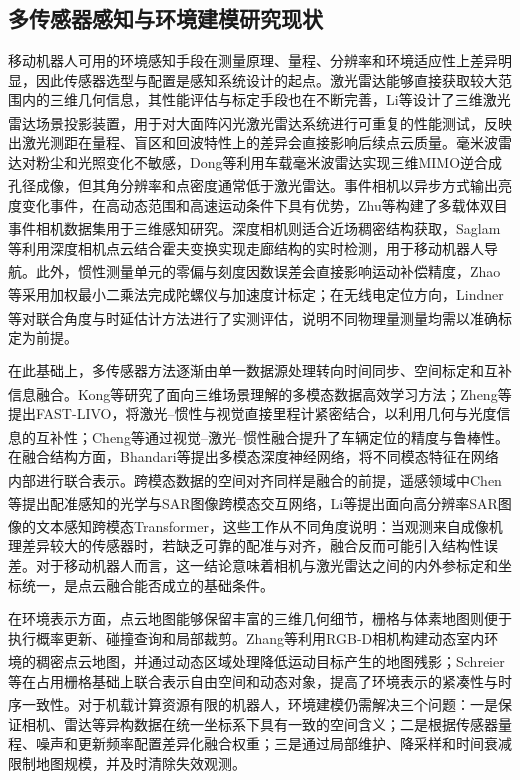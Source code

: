 \subsection{多传感器感知与环境建模研究现状}
移动机器人可用的环境感知手段在测量原理、量程、分辨率和环境适应性上差异明显，因此传感器选型与配置是感知系统设计的起点。激光雷达能够直接获取较大范围内的三维几何信息，其性能评估与标定手段也在不断完善，Li等设计了三维激光雷达场景投影装置，用于对大面阵闪光激光雷达系统进行可重复的性能测试\textsuperscript{\cite{LI2025112972}}，反映出激光测距在量程、盲区和回波特性上的差异会直接影响后续点云质量。毫米波雷达对粉尘和光照变化不敏感，Dong等利用车载毫米波雷达实现三维MIMO逆合成孔径成像\textsuperscript{\cite{10028086}}，但其角分辨率和点密度通常低于激光雷达。事件相机以异步方式输出亮度变化事件，在高动态范围和高速运动条件下具有优势，Zhu等构建了多载体双目事件相机数据集用于三维感知研究\textsuperscript{\cite{8288670}}。深度相机则适合近场稠密结构获取，Saglam等利用深度相机点云结合霍夫变换实现走廊结构的实时检测，用于移动机器人导航\textsuperscript{\cite{9649842}}。此外，惯性测量单元的零偏与刻度因数误差会直接影响运动补偿精度，Zhao等采用加权最小二乘法完成陀螺仪与加速度计标定\textsuperscript{\cite{8996235}}；在无线电定位方向，Lindner等对联合角度与时延估计方法进行了实测评估\textsuperscript{\cite{7346780}}，说明不同物理量测量均需以准确标定为前提。

在此基础上，多传感器方法逐渐由单一数据源处理转向时间同步、空间标定和互补信息融合。Kong等研究了面向三维场景理解的多模态数据高效学习方法\textsuperscript{\cite{10856442}}；Zheng等提出FAST-LIVO，将激光--惯性与视觉直接里程计紧密结合，以利用几何与光度信息的互补性\textsuperscript{\cite{9981107}}；Cheng等通过视觉--激光--惯性融合提升了车辆定位的精度与鲁棒性\textsuperscript{\cite{10475560}}。在融合结构方面，Bhandari等提出多模态深度神经网络，将不同模态特征在网络内部进行联合表示\textsuperscript{\cite{8628711}}。跨模态数据的空间对齐同样是融合的前提，遥感领域中Chen等提出配准感知的光学与SAR图像跨模态交互网络\textsuperscript{\cite{CHEN2025103278}}，Li等提出面向高分辨率SAR图像的文本感知跨模态Transformer\textsuperscript{\cite{LI2025152}}，这些工作从不同角度说明：当观测来自成像机理差异较大的传感器时，若缺乏可靠的配准与对齐，融合反而可能引入结构性误差。对于移动机器人而言，这一结论意味着相机与激光雷达之间的内外参标定和坐标统一，是点云融合能否成立的基础条件。

在环境表示方面，点云地图能够保留丰富的三维几何细节，栅格与体素地图则便于执行概率更新、碰撞查询和局部裁剪。Zhang等利用RGB-D相机构建动态室内环境的稠密点云地图，并通过动态区域处理降低运动目标产生的地图残影\textsuperscript{\cite{9327342}}；Schreier等在占用栅格基础上联合表示自由空间和动态对象，提高了环境表示的紧凑性与时序一致性\textsuperscript{\cite{7271102}}。对于机载计算资源有限的机器人，环境建模仍需解决三个问题：一是保证相机、雷达等异构数据在统一坐标系下具有一致的空间含义；二是根据传感器量程、噪声和更新频率配置差异化融合权重；三是通过局部维护、降采样和时间衰减限制地图规模，并及时清除失效观测。

